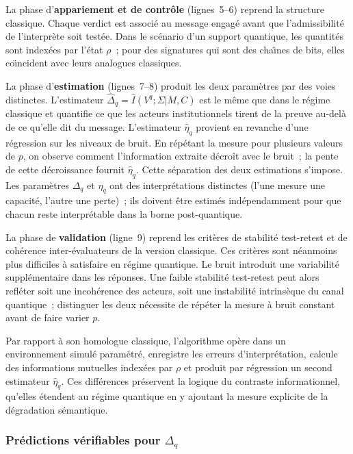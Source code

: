 \begin{sloppypar}
La phase d'\textbf{appariement et de contr\^ole} (lignes~5--6) reprend la
structure classique. Chaque verdict est associ\'e au message engag\'e
avant que l'admissibilit\'e de l'interpr\`ete soit test\'ee. Dans le sc\'enario d'un
support quantique, les quantit\'es sont index\'ees par l'\'etat $\rho$~;
pour des signatures qui sont des cha\^{\i}nes de bits, elles co\"{\i}ncident
avec leurs analogues classiques.

La phase d'\textbf{estimation} (lignes~7--8) produit les deux param\`etres
par des voies distinctes. L'estimateur $\hat\Delta_q = \hat I(V^q;\Sigma|M,C)$ est le
m\^eme que dans le r\'egime classique et quantifie ce que les acteurs
institutionnels tirent de la preuve au-del\`a de ce qu'elle dit du message. L'estimateur $\hat\eta_q$ provient en revanche
d'une r\'egression sur les niveaux de bruit. En r\'ep\'etant
la mesure pour plusieurs valeurs de $p$, on observe comment
l'information extraite d\'ecro\^it avec le bruit~; la pente de cette
d\'ecroissance fournit $\hat\eta_q$. Cette s\'eparation des deux
estimations s'impose. Les param\`etres $\Delta_q$ et $\eta_q$ ont des
interpr\'etations distinctes (l'une mesure une capacit\'e, l'autre une
perte)~; ils doivent \^etre estim\'es ind\'ependamment pour que chacun reste
interpr\'etable dans la borne post-quantique.

La phase de \textbf{validation} (ligne~9) reprend les crit\`eres de
stabilit\'e test-retest et de coh\'erence inter-\'evaluateurs de la
version classique. Ces crit\`eres sont n\'eanmoins plus difficiles \`a
satisfaire en r\'egime quantique. Le bruit introduit une variabilit\'e
suppl\'ementaire dans les r\'eponses. Une faible stabilit\'e test-retest
peut alors refl\'eter soit une incoh\'erence des acteurs, soit une
instabilit\'e intrins\`eque du canal quantique~; distinguer les deux
n\'ecessite de r\'ep\'eter la mesure \`a bruit constant avant de faire
varier $p$.

Par rapport \`a son homologue classique, l'algorithme op\`ere dans un
environnement simul\'e param\'etr\'e, enregistre les erreurs d'interpr\'etation,
calcule des informations mutuelles index\'ees par $\rho$ et produit par
r\'egression un second estimateur $\hat\eta_q$. Ces diff\'erences pr\'eservent
la logique du contraste informationnel, qu'elles \'etendent au r\'egime
quantique en y ajoutant la mesure explicite de la d\'egradation
s\'emantique.

\subsubsection{Pr\'edictions v\'erifiables pour $\Delta_q$}
\label{subsubsec:predictions_delta_q}


\end{sloppypar}
